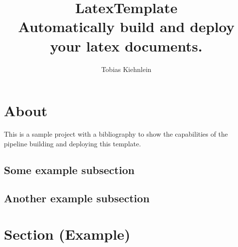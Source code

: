 \documentclass[
    paper=a4, %
    fontsize=10pt,  %
    oneside,        %
    headsepline,    %
    notitlepage     %
]{extarticle}         %
\author{Tobias Kiehnlein}
\title{\textbf{LatexTemplate}\\\large{Automatically build and deploy your latex documents.}}
\date{}
\begin{document}
    \pagestyle{empty}
    \maketitle
    \tableofcontents
    \newpage
    \pagestyle{headings}

    \section{About}
    This is a sample project with a bibliography to show the capabilities of the pipeline building and deploying this template.\cite{latexTemplate}

    \subsection{Some example subsection}
    \subsection{Another example subsection}

    \section{Section (Example)}

    \newpage
    \printbibliography[heading=bibintoc]
    \newpage
    \listoffigures
\end{document}
